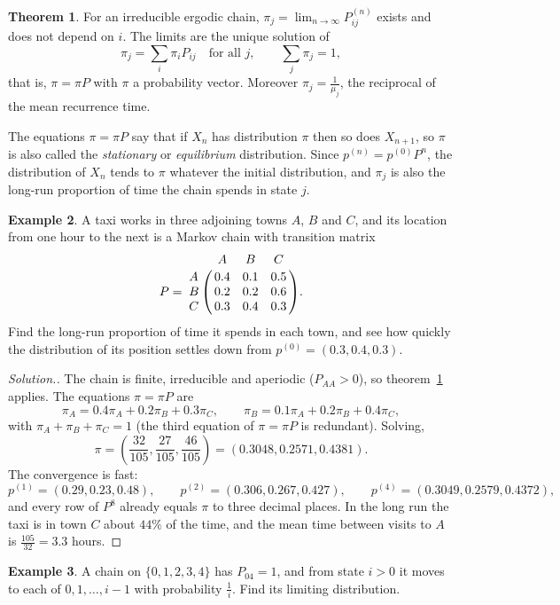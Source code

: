 \documentclass[12pt,a4paper]{report}
\theoremstyle{definition}
\newtheorem{thm}{Theorem}[section]
\newtheorem{exa}[thm]{Example}
\newenvironment{solution}
  {\renewcommand{\qedsymbol}{}\begin{proof}[\textit{Solution}.]}
  {\end{proof}}
\begin{document}
\begin{thm}
\label{thm:limiting}
For an irreducible ergodic chain, $\pi_j = \lim_{n\to\infty}P_{ij}^{(n)}$ exists and does not depend
on $i$. The limits are the unique solution of
\[\pi_j = \sum_i\pi_iP_{ij}\quad\text{for all } j,\qquad\sum_j\pi_j = 1,\]
that is, $\pi = \pi P$ with $\pi$ a probability vector. Moreover $\pi_j = \frac{1}{\mu_j}$, the
reciprocal of the mean recurrence time.
\end{thm}

The equations $\pi = \pi P$ say that if $X_n$ has distribution $\pi$ then so does $X_{n + 1}$, so $\pi$
is also called the \emph{stationary} or \emph{equilibrium} distribution. Since
$p^{(n)} = p^{(0)}P^n$, the distribution of $X_n$ tends to $\pi$ whatever the initial distribution,
and $\pi_j$ is also the long-run proportion of time the chain spends in state $j$.

\begin{exa}
\label{ex:cab}
A taxi works in three adjoining towns $A$, $B$ and $C$, and its location from one hour to the
next is a Markov chain with transition matrix
\[P = \bordermatrix{~ & A & B & C\cr A & 0.4 & 0.1 & 0.5\cr B & 0.2 & 0.2 & 0.6\cr C & 0.3 & 0.4 & 0.3\cr} .\]
Find the long-run proportion of time it spends in each town, and see how quickly the
distribution of its position settles down from $p^{(0)} = (0.3, 0.4, 0.3)$.
\end{exa}

\begin{solution}
The chain is finite, irreducible and aperiodic ($P_{AA}>0$), so theorem~\ref{thm:limiting} applies.
The equations $\pi = \pi P$ are
\[\pi_A = 0.4\pi_A + 0.2\pi_B + 0.3\pi_C,\qquad \pi_B = 0.1\pi_A + 0.2\pi_B + 0.4\pi_C,\]
with $\pi_A + \pi_B + \pi_C = 1$ (the third equation of $\pi = \pi P$ is redundant). Solving,
\[\pi = \left(\frac{32}{105}, \frac{27}{105}, \frac{46}{105}\right) = (0.3048, 0.2571, 0.4381).\]
The convergence is fast:
\[p^{(1)} = (0.29, 0.23, 0.48),\qquad p^{(2)} = (0.306, 0.267, 0.427),\qquad p^{(4)} = (0.3049, 0.2579, 0.4372),\]
and every row of $P^8$ already equals $\pi$ to three decimal places. In the long run the taxi
is in town $C$ about $44\%$ of the time, and the mean time between visits to $A$ is
$\frac{105}{32} = 3.3$ hours.
\end{solution}

\begin{exa}
\label{ex:fivestate}
A chain on $\{0, 1, 2, 3, 4\}$ has $P_{04} = 1$, and from state $i>0$ it moves to each of
$0, 1, \dots, i - 1$ with probability $\frac1i$. Find its limiting distribution.
\end{exa}
\end{document}
